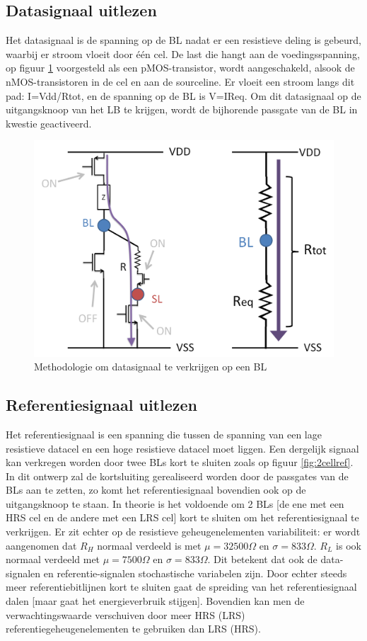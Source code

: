 \subsection{Datasignaal uitlezen}
Het datasignaal is de spanning op de BL nadat er een resistieve deling is gebeurd, waarbij er stroom vloeit door één cel. De last die hangt aan de voedingsspanning, op figuur \ref{fig:dataread} voorgesteld als een pMOS-transistor, wordt aangeschakeld, alsook de nMOS-transistoren in de cel en aan de sourceline. Er vloeit een stroom langs dit pad: I=Vdd/Rtot, en de spanning op de BL is V=IReq. Om dit datasignaal op de uitgangsknoop van het LB te krijgen, wordt de bijhorende passgate van de BL in kwestie geactiveerd.

\begin{figure}
  \centering
  \includegraphics[scale=0.3]{../fig/hfdstk-architecture-datasignal.png}
  \caption{Methodologie om datasignaal te verkrijgen op een BL}
  \label{fig:dataread}
\end{figure}

\subsection{Referentiesignaal uitlezen}
Het referentiesignaal is een spanning die tussen de spanning van een lage resistieve datacel en een hoge resistieve datacel moet liggen. Een dergelijk signaal kan verkregen worden door twee BLs kort te sluiten zoals op figuur \ref{fig:2cellref}. In dit ontwerp zal de kortsluiting gerealiseerd worden door de passgates van de BLs aan te zetten, zo komt het referentiesignaal bovendien ook op de uitgangsknoop te staan. In theorie is het voldoende om 2 BLs [de ene met een HRS cel en de andere met een LRS cel] kort te sluiten om het referentiesignaal te verkrijgen. Er zit echter op de resistieve geheugenelementen variabiliteit: er wordt aangenomen dat $R_{H}$ normaal verdeeld is met $\mu = 32500\Omega$ en $\sigma = 833\Omega$. $R_{L}$ is ook normaal verdeeld met $\mu = 7500\Omega$ en $\sigma = 833\Omega$. Dit betekent dat ook de data-signalen en referentie-signalen stochastische variabelen zijn.
Door echter steeds meer referentiebitlijnen kort te sluiten gaat de spreiding van het referentiesignaal dalen [maar gaat het energieverbruik stijgen]. Bovendien kan men de verwachtingswaarde verschuiven door meer HRS (LRS) referentiegeheugenelementen te gebruiken dan LRS (HRS).

